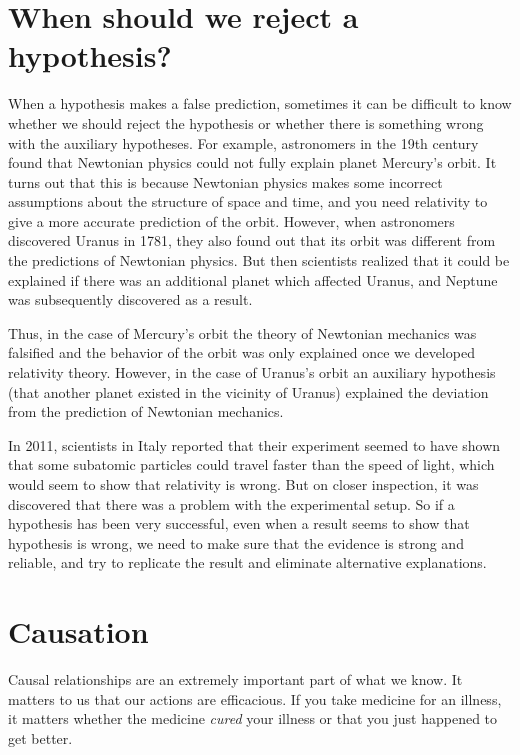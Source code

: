 \section{When should we reject a hypothesis?}

When a hypothesis makes a false prediction, sometimes it can be difficult to know whether we should reject the hypothesis or whether there is something wrong with the auxiliary hypotheses. For example, astronomers in the 19th century found that Newtonian physics could not fully explain planet Mercury's orbit. It turns out that this is because Newtonian physics makes some incorrect assumptions about the structure of space and time, and you need relativity to give a more accurate prediction of the orbit. However, when astronomers discovered Uranus in 1781, they also found out that its orbit was different from the predictions of Newtonian physics. But then scientists realized that it could be explained if there was an additional planet which affected Uranus, and Neptune was subsequently discovered as a result.

Thus, in the case of Mercury's orbit the theory of Newtonian mechanics was falsified and the behavior of the orbit was only explained once we developed relativity theory. However, in the case of Uranus's orbit an auxiliary hypothesis (that another planet existed in the vicinity of Uranus) explained the deviation from the prediction of Newtonian mechanics.

In 2011, scientists in Italy reported that their experiment seemed to have shown that some subatomic particles could travel faster than the speed of light, which would seem to show that relativity is wrong. But on closer inspection, it was discovered that there was a problem with the experimental setup. So if a hypothesis has been very successful, even when a result seems to show that hypothesis is wrong, we need to make sure that the evidence is strong and reliable, and try to replicate the result and eliminate alternative explanations.

\section{Causation}

Causal relationships are an extremely important part of what we know. It matters to us that our actions are efficacious. If you take medicine for an illness, it matters whether the medicine \emph{cured} your illness or that you just happened to get better.

